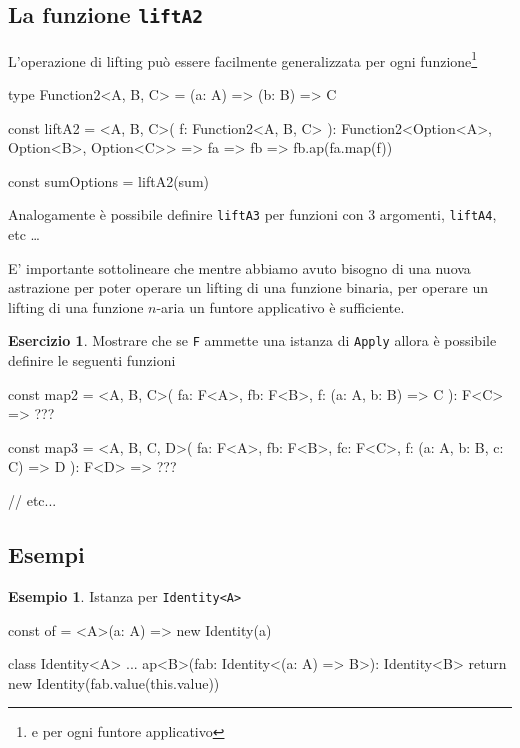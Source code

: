 \documentclass[12pt]{article}
\theoremstyle{definition}
\newtheorem{example}{Esempio}[section]
\newtheorem{exercise}{Esercizio}[section]
\newenvironment{code}
  {\vspace{0.5cm} \VerbatimEnvironment\begin{typescriptcode}}
  {\end{typescriptcode} \vspace{0.2cm}}
\begin{document}
\subsection{La funzione \texttt{liftA2}}

L'operazione di lifting può essere facilmente generalizzata per ogni funzione\footnote{e per ogni funtore applicativo}

\begin{code}
type Function2<A, B, C> = (a: A) => (b: B) => C

const liftA2 = <A, B, C>(
  f: Function2<A, B, C>
): Function2<Option<A>, Option<B>, Option<C>> => fa => fb =>
  fb.ap(fa.map(f))

const sumOptions = liftA2(sum)
\end{code}

Analogamente è possibile definire \texttt{liftA3} per funzioni con 3 argomenti, \texttt{liftA4}, etc \ldots

E' importante sottolineare che mentre abbiamo avuto bisogno di una nuova astrazione per poter operare un lifting di una funzione binaria,
per operare un lifting di una funzione $n$-aria un funtore applicativo è sufficiente.

\begin{exercise}
Mostrare che se \texttt{F} ammette una istanza di \texttt{Apply} allora è possibile definire le seguenti funzioni

\begin{code}
const map2 = <A, B, C>(
  fa: F<A>,
  fb: F<B>,
  f: (a: A, b: B) => C
): F<C> => ???

const map3 = <A, B, C, D>(
  fa: F<A>,
  fb: F<B>,
  fc: F<C>,
  f: (a: A, b: B, c: C) => D
): F<D> => ???

// etc...
\end{code}
\end{exercise}

\subsection{Esempi}

\begin{example}
Istanza per \texttt{Identity<A>}

\begin{code}
const of = <A>(a: A) => new Identity(a)

class Identity<A> {
  ...
  ap<B>(fab: Identity<(a: A) => B>): Identity<B> {
    return new Identity(fab.value(this.value))
  }
}
\end{code}
\end{example}
\end{document}
